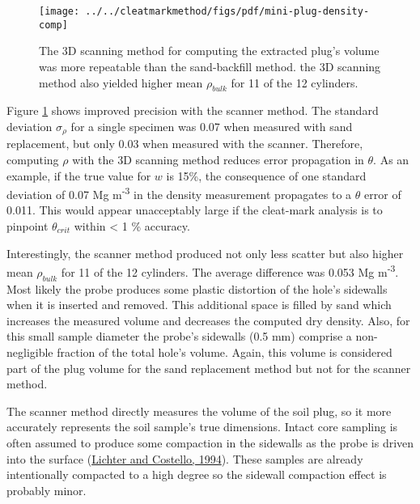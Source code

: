 \documentclass[
  letterpaper,
  openany]{book}
\begin{document}
\begin{figure}

{\centering \texttt{[image: ../../cleatmarkmethod/figs/pdf/mini-plug-density-comp]} 

}

\caption[$\rho$ obtained from 3D scanning and sand replacement]{The 3D scanning method for computing the extracted plug's volume was more repeatable than the sand-backfill method. the 3D scanning method also yielded higher mean \(\rho_{bulk}\) for 11 of the 12 cylinders.}\label{fig:sand-backfill-vs-3D-scanner-for-volumetric-w-determination-fig}
\end{figure}

Figure \ref{fig:sand-backfill-vs-3D-scanner-for-volumetric-w-determination-fig} shows improved precision with the scanner method.
The standard deviation \(\sigma_{\rho}\) for a single specimen was 0.07 when measured with sand replacement, but only 0.03 when measured with the scanner.
Therefore, computing \(\rho\) with the 3D scanning method reduces error propagation in \(\theta\).
As an example, if the true value for \(w\) is 15\%, the consequence of one standard deviation of 0.07 Mg m\textsuperscript{-3} in the density measurement propagates to a \(\theta\) error of 0.011. This would appear unacceptably large if the cleat-mark analysis is to pinpoint \(\theta_{crit}\) within \textless{} 1 \% accuracy.

Interestingly, the scanner method produced not only less scatter but also higher mean \(\rho_{bulk}\) for 11 of the 12 cylinders.
The average difference was 0.053 Mg m\textsuperscript{-3}. Most likely the probe produces some plastic distortion of the hole's sidewalls when it is inserted and removed.
This additional space is filled by sand which increases the measured volume and decreases the computed dry density.
Also, for this small sample diameter the probe's sidewalls (0.5 mm) comprise a non-negligible fraction of the total hole's volume.
Again, this volume is considered part of the plug volume for the sand replacement method but not for the scanner method.

The scanner method directly measures the volume of the soil plug, so it more accurately represents the soil sample's true dimensions.
Intact core sampling is often assumed to produce some compaction in the sidewalls as the probe is driven into the surface (\protect\hyperlink{ref-Lichter1994}{Lichter and Costello, 1994}).
These samples are already intentionally compacted to a high degree so the sidewall compaction effect is probably minor.
\end{document}
